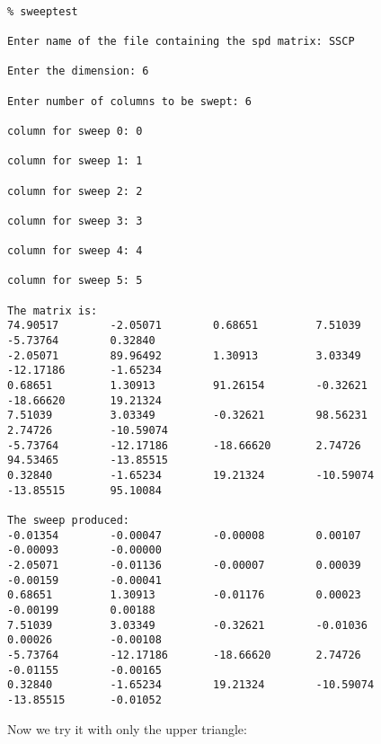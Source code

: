 \documentclass{article}
\begin{document}
{\tt
\begin{verbatim}
% sweeptest
 
Enter name of the file containing the spd matrix: SSCP
 
Enter the dimension: 6
 
Enter number of columns to be swept: 6
 
column for sweep 0: 0
 
column for sweep 1: 1
 
column for sweep 2: 2
 
column for sweep 3: 3
 
column for sweep 4: 4
 
column for sweep 5: 5
 
The matrix is: 
74.90517        -2.05071        0.68651         7.51039         -5.73764        0.32840 
-2.05071        89.96492        1.30913         3.03349         -12.17186       -1.65234 
0.68651         1.30913         91.26154        -0.32621        -18.66620       19.21324 
7.51039         3.03349         -0.32621        98.56231        2.74726         -10.59074 
-5.73764        -12.17186       -18.66620       2.74726         94.53465        -13.85515 
0.32840         -1.65234        19.21324        -10.59074       -13.85515       95.10084 
 
The sweep produced: 
-0.01354        -0.00047        -0.00008        0.00107         -0.00093        -0.00000 
-2.05071        -0.01136        -0.00007        0.00039         -0.00159        -0.00041 
0.68651         1.30913         -0.01176        0.00023         -0.00199        0.00188 
7.51039         3.03349         -0.32621        -0.01036        0.00026         -0.00108 
-5.73764        -12.17186       -18.66620       2.74726         -0.01155        -0.00165 
0.32840         -1.65234        19.21324        -10.59074       -13.85515       -0.01052 
\end{verbatim}
}
Now we try it with only the upper triangle:\\
\end{document}
